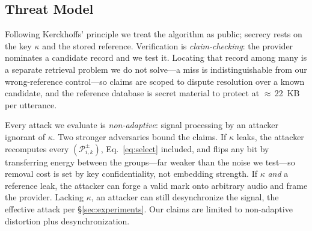 \subsection{Threat Model}
\label{sec:method:threat}
Following Kerckhoffs' principle we treat the algorithm as public; secrecy rests on the
key $\kappa$ and the stored reference. Verification is \emph{claim-checking}: the
provider nominates a candidate record and we test it. Locating that record among many is
a separate retrieval problem we do not solve---a miss is indistinguishable from our
wrong-reference control---so claims are scoped to dispute resolution over a known
candidate, and the reference database is secret material to protect at
$\approx$\,22~KB per utterance.

Every attack we evaluate is \emph{non-adaptive}: signal processing by an attacker
ignorant of $\kappa$. Two stronger adversaries bound the claims. If $\kappa$ leaks, the
attacker recomputes every $(\mathcal{P}^{\pm}_{i,k})$, Eq.~\eqref{eq:select} included,
and flips any bit by transferring energy between the groups---far weaker than the noise
we test---so removal cost is set by key confidentiality, not embedding strength. If
$\kappa$ \emph{and} a reference leak, the attacker can forge a valid mark onto
arbitrary audio and frame the provider. Lacking $\kappa$, an attacker can still
desynchronize the signal, the effective attack per \S\ref{sec:experiments}. Our claims
are limited to non-adaptive distortion plus desynchronization.